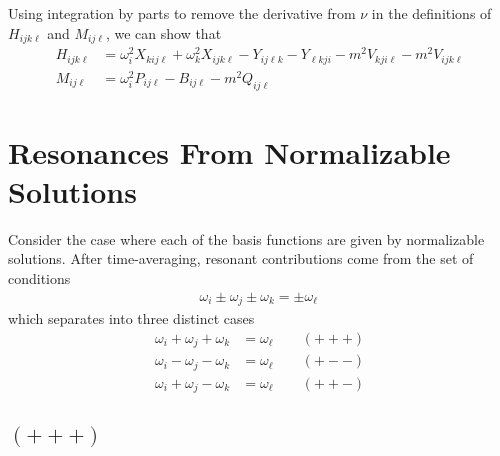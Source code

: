 \documentclass[letterpaper,11pt]{article}
\newcommand{\oi}{\omega_i}
\newcommand{\oj}{\omega_j}
\newcommand{\ok}{\omega_k}
\newcommand{\ol}{\omega_\ell}
\begin{document}
Using integration by parts to remove the derivative from $\nu$ in the definitions of $H_{ijk\ell}$ and $M_{ij\ell}$, we can show that
\begin{align}
H_{ijk\ell} &= \oi^2 X_{kij\ell} + \ok^2 X_{ijk\ell} - Y_{ij\ell k}  - Y_{\ell kji}   - m^2 V_{kji\ell} -m^2 V_{ijk\ell} \\
M_{ij\ell} &= \oi^2 P_{ij\ell} - B_{ij\ell} -m^2 Q_{ij\ell}
\end{align}


\section{Resonances From Normalizable Solutions}
Consider the case where each of the basis functions are given by normalizable solutions. After time-averaging, resonant contributions come from the set of conditions
\begin{align}
\oi \pm \oj \pm \ok = \pm \ol \,
\end{align}
which separates into three distinct cases
\begin{align}
\oi + \oj + \ok &= \ol \qquad (+++) \\
\oi - \oj - \ok &= \ol \qquad (+--) \\
\oi + \oj - \ok &= \ol \qquad (++-)
\end{align}


\subsection{$(+++)$}
\end{document}
